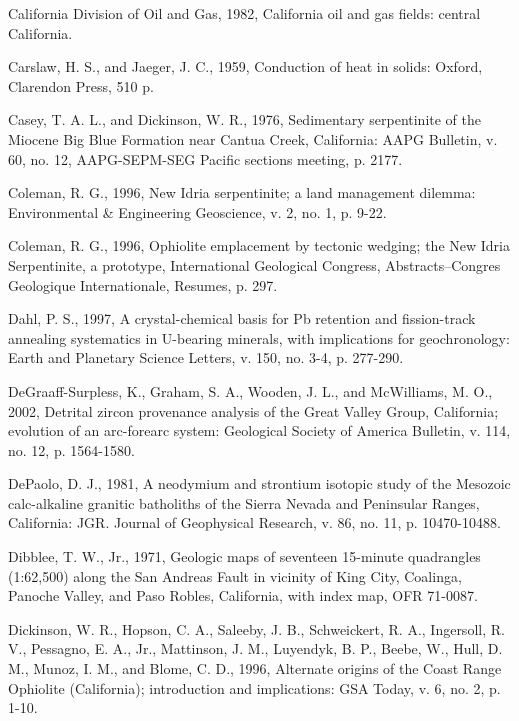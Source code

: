 \documentclass[11pt,twoside]{article}
\begin{document}
\begin{description}
\item California Division of Oil and Gas, 1982, California oil and gas
fields: central California.

\item Carslaw, H.  S., and Jaeger, J. C., 1959,  Conduction of heat in
solids: Oxford, Clarendon Press, 510 p.

\item  Casey,  T. A.  L.,  and  Dickinson,  W. R.,  1976,  Sedimentary
serpentinite  of the  Miocene Big  Blue Formation  near  Cantua Creek,
California:  AAPG  Bulletin,  v.  60, no.  12,  AAPG-SEPM-SEG  Pacific
sections meeting, p. 2177.

\item Coleman, R. G., 1996,  New Idria serpentinite; a land management
dilemma:  Environmental  \& Engineering  Geoscience,  v.   2, no.   1,
p. 9-22.

\item Coleman, R. G., 1996, Ophiolite emplacement by tectonic wedging;
the  New  Idria Serpentinite,  a  prototype, International  Geological
Congress,   Abstracts--Congres  Geologique   Internationale,  Resumes,
p. 297.

\item Dahl, P. S., 1997, A crystal-chemical basis for Pb retention and
fission-track  annealing  systematics   in  U-bearing  minerals,  with
implications for  geochronology: Earth and  Planetary Science Letters,
v. 150, no. 3-4, p. 277-290.

\item  DeGraaff-Surpless,  K.,  Graham,  S.  A., Wooden,  J.  L.,  and
McWilliams, M.  O., 2002, Detrital  zircon provenance analysis  of the
Great Valley  Group, California;  evolution of an  arc-forearc system:
Geological   Society   of   America   Bulletin,  v.   114,   no.   12,
p. 1564-1580.

\item DePaolo, D.  J., 1981, A  neodymium and strontium
isotopic study  of the  Mesozoic calc-alkaline granitic  batholiths of
the Sierra  Nevada and Peninsular Ranges, California:  JGR. Journal of
Geophysical Research, v. 86, no. 11, p. 10470-10488.

\item Dibblee, T. W., Jr.,  1971, Geologic maps of seventeen 15-minute
quadrangles (1:62,500) along the San Andreas Fault in vicinity of King
City,  Coalinga, Panoche  Valley,  and Paso  Robles, California,  with
index map, OFR 71-0087.

\item Dickinson,  W. R., Hopson,  C. A., Saleeby, J.  B., Schweickert,
R.  A., Ingersoll,  R. V.,  Pessagno, E.  A., Jr.,  Mattinson,  J. M.,
Luyendyk, B.  P., Beebe,  W., Hull,  D. M., Munoz,  I. M.,  and Blome,
C.  D.,   1996,  Alternate  origins  of  the   Coast  Range  Ophiolite
(California); introduction  and implications: GSA Today, v.  6, no. 2,
p. 1-10.


\end{description}
\end{document}
